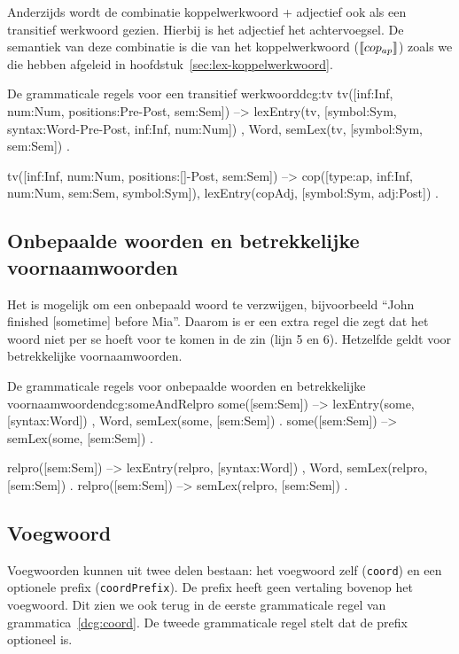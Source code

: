 Anderzijds wordt de combinatie koppelwerkwoord + adjectief ook als een transitief werkwoord gezien. Hierbij is het adjectief het achtervoegsel. De semantiek van deze combinatie is die van het koppelwerkwoord ($\llbracket cop_{ap}\rrbracket$) zoals we die hebben afgeleid in hoofdstuk~\ref{sec:lex-koppelwerkwoord}.
\begin{dcg}{De grammaticale regels voor een transitief werkwoord}{dcg:tv}
tv([inf:Inf, num:Num, positions:Pre-Post, sem:Sem]) -->
  { lexEntry(tv, [symbol:Sym, syntax:Word-Pre-Post, inf:Inf, num:Num]) },
  Word,
  { semLex(tv, [symbol:Sym, sem:Sem]) }.

tv([inf:Inf, num:Num, positions:[]-Post, sem:Sem]) -->
  cop([type:ap, inf:Inf, num:Num, sem:Sem, symbol:Sym]),
  { lexEntry(copAdj, [symbol:Sym, adj:Post]) }.
\end{dcg}

\subsection{Onbepaalde woorden en betrekkelijke voornaamwoorden}
Het is mogelijk om een onbepaald woord te verzwijgen, bijvoorbeeld ``John finished [sometime] before Mia''. Daarom is er een extra regel die zegt dat het woord niet per se hoeft voor te komen in de zin (lijn 5 en 6). Hetzelfde geldt voor betrekkelijke voornaamwoorden.

\begin{dcg}{De grammaticale regels voor onbepaalde woorden en betrekkelijke voornaamwoorden}{dcg:someAndRelpro}
some([sem:Sem]) -->
  { lexEntry(some, [syntax:Word]) },
  Word,
  { semLex(some, [sem:Sem]) }.
some([sem:Sem]) -->
  { semLex(some, [sem:Sem]) }.

relpro([sem:Sem]) -->
  { lexEntry(relpro, [syntax:Word]) },
  Word,
  { semLex(relpro, [sem:Sem]) }.
relpro([sem:Sem]) -->
  { semLex(relpro, [sem:Sem]) }.
\end{dcg}

\subsection{Voegwoord}
Voegwoorden kunnen uit twee delen bestaan: het voegwoord zelf (\texttt{coord}) en een optionele prefix (\texttt{coordPrefix}). De prefix heeft geen vertaling bovenop het voegwoord. Dit zien we ook terug in de eerste grammaticale regel van grammatica~\ref{dcg:coord}. De tweede grammaticale regel stelt dat de prefix optioneel is.

